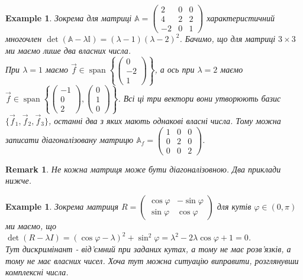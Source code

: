 \documentclass[a4paper, 10pt]{article}
\theoremstyle{theoremdd}
\newtheorem{example}[theorem]{Example}
\newtheorem{remark}[theorem]{Remark}
\DeclareMathOperator{\linspan}{span}
\begin{document}
\begin{example}
Зокрема для матриці $\mathbb{A} = \begin{pmatrix}
2 & 0 & 0 \\
4 & 2 & 2 \\
-2 & 0 & 1
\end{pmatrix}$ характеристичний многочлен $\det (\mathbb{A}-\lambda \mathbb{I}) = (\lambda-1)(\lambda-2)^2$. Бачимо, що для матриці $3 \times 3$ ми маємо лише два власних числа.\\
При $\lambda = 1$ маємо $\vec{f} \in \linspan \left\{ \begin{pmatrix}
0 \\ -2 \\ 1
\end{pmatrix} \right\}$, а ось при $\lambda = 2$ маємо $\vec{f} \in \linspan \left\{ \begin{pmatrix}
-1 \\ 0 \\ 2
\end{pmatrix}, \begin{pmatrix}
0 \\ 1 \\ 0
\end{pmatrix} \right\}$. Всі ці три вектори вони утворюють базис $\{\vec{f}_1,\vec{f}_2,\vec{f}_3 \}$, останні два з яких мають однакові власні числа. Тому можна записати діагоналізовану матрицю $\mathbb{A}_f = \begin{pmatrix}
1 & 0 & 0 \\
0 & 2 & 0 \\
0 & 0 & 2
\end{pmatrix}$.
\end{example}

\begin{remark}
Не кожна матриця може бути діагоналізовною. Два приклади нижче.
\end{remark}

\begin{example}
Зокрема матриця $R = \begin{pmatrix}
\cos \varphi & -\sin \varphi \\
\sin \varphi & \cos \varphi
\end{pmatrix}$ для кутів $\varphi \in (0,\pi)$ ми маємо, що\\
$\det (R - \lambda I) = (\cos \varphi-\lambda)^2 + \sin^2 \varphi = \lambda^2 - 2\lambda \cos \varphi + 1 = 0$.\\
Тут дискримінант - від'ємний при заданих кутах, а тому не має розв'язків, а тому не має власних чисел. Хоча тут можна ситуацію виправити, розглянувши комплексні числа.
\end{example}
\end{document}
